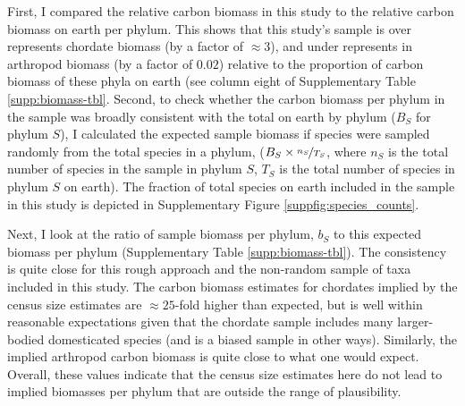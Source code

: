 \documentclass[11pt]{article}
\begin{document}
First, I compared the relative carbon biomass in this study to the relative
carbon biomass on earth per phylum. This shows that this study's sample is over
represents chordate biomass (by a factor of $\approx 3$), and under represents
in arthropod biomass (by a factor of $0.02$) relative to the proportion of
carbon biomass of these phyla on earth (see column eight of Supplementary Table
\ref{supp:biomass-tbl}. Second, to check whether the carbon biomass per phylum
in the sample was broadly consistent with the total on earth by phylum ($B_S$
for phylum $S$), I calculated the expected sample biomass if species were
sampled randomly from the total species in a phylum, ($B_S \times
\nicefrac{n_S}{T_S}$, where $n_S$ is the total number of species in the sample
in phylum $S$, $T_S$ is the total number of species in phylum $S$ on earth).
The fraction of total species on earth included in the sample in this study is
depicted in Supplementary Figure \ref{suppfig:species_counts}.  

Next, I look at the ratio of sample biomass per phylum, $b_S$ to this expected
biomass per phylum (Supplementary Table \ref{supp:biomass-tbl}). The
consistency is quite close for this rough approach and the non-random sample of
taxa included in this study. The carbon biomass estimates for chordates implied
by the census size estimates are $\approx 25$-fold higher than expected, but is
well within reasonable expectations given that the chordate sample includes
many larger-bodied domesticated species (and is a biased sample in other ways).
Similarly, the implied arthropod carbon biomass is quite close to what one
would expect. Overall, these values indicate that the census size estimates
here do not lead to implied biomasses per phylum that are outside the range of
plausibility.
\end{document}
